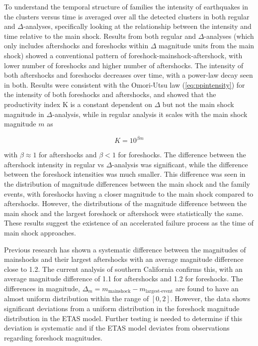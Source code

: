 \documentclass[12pt]{article} %
\theoremstyle{plain}
\begin{document}
	To understand the temporal structure of families the intensity of earthquakes in the clusters versus time is averaged over all the detected clusters in both regular and $\Delta$-analyses, specifically looking at the relationship between the intensity and time relative to the main shock. Results from both regular and $\Delta$-analyses (which only includes aftershocks and foreshocks within $\Delta$ magnitude units from the main shock) showed a conventional pattern of foreshock-mainshock-aftershock, with lower number of foreshocks and higher number of aftershocks. The intensity of both aftershocks and foreshocks decreases over time, with a power-law decay seen in both. Results were consistent with the Omori-Utsu law (\ref{eq:ppintensity}) for the intensity of both foreshocks and aftershocks, and showed that the productivity index K is a constant dependent on $\Delta$ but not the main shock magnitude in $\Delta$-analysis, while in regular analysis it scales with the main shock magnitude $m$ as
	
	\begin{equation} \label{eq:K}
		K=10^{\beta m }
	\end{equation}

	\noindent with $\beta \approx 1$ for aftershocks and $\beta <1$ for foreshocks. The difference between the aftershock intensity in regular vs $\Delta$-analysis was significant, while the difference between the foreshock intensities was much smaller. This difference was seen in the distribution of magnitude differences between the main shock and the family events, with foreshocks having a closer magnitude to the main shock compared to aftershocks. However, the distributions of the magnitude difference between the main shock and the largest foreshock or aftershock were statistically the same. These results suggest the existence of an accelerated failure process as the time of main shock approaches.
	
	Previous research has shown a systematic difference between the magnitudes of mainshocks and their largest aftershocks with an average magnitude difference close to 1.2. The current analysis of southern California confirms this, with an average magnitude difference of 1.1 for aftershocks and 1.2 for foreshocks. The differences in magnitude, $\Delta_m = m_{\text{mainshock}}-m_{\text{largest-event}}$ are found to have an almost uniform distribution within the range of $[0, 2]$. However, the data shows significant deviations from a uniform distribution in the foreshock magnitude distribution in the ETAS model. Further testing is needed to determine if this deviation is systematic and if the ETAS model deviates from observations regarding foreshock magnitudes.
	
\end{document}

